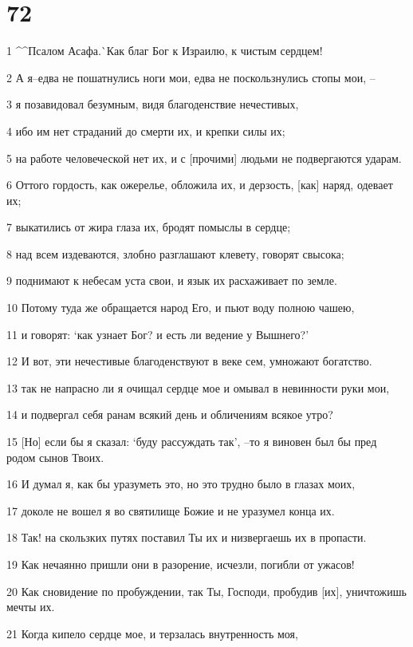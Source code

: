 \chapter{72}

\par 1 ^^Псалом Асафа.^^ Как благ Бог к Израилю, к чистым сердцем!
\par 2 А я--едва не пошатнулись ноги мои, едва не поскользнулись стопы мои, --
\par 3 я позавидовал безумным, видя благоденствие нечестивых,
\par 4 ибо им нет страданий до смерти их, и крепки силы их;
\par 5 на работе человеческой нет их, и с [прочими] людьми не подвергаются ударам.
\par 6 Оттого гордость, как ожерелье, обложила их, и дерзость, [как] наряд, одевает их;
\par 7 выкатились от жира глаза их, бродят помыслы в сердце;
\par 8 над всем издеваются, злобно разглашают клевету, говорят свысока;
\par 9 поднимают к небесам уста свои, и язык их расхаживает по земле.
\par 10 Потому туда же обращается народ Его, и пьют воду полною чашею,
\par 11 и говорят: `как узнает Бог? и есть ли ведение у Вышнего?'
\par 12 И вот, эти нечестивые благоденствуют в веке сем, умножают богатство.
\par 13 так не напрасно ли я очищал сердце мое и омывал в невинности руки мои,
\par 14 и подвергал себя ранам всякий день и обличениям всякое утро?
\par 15 [Но] если бы я сказал: `буду рассуждать так', --то я виновен был бы пред родом сынов Твоих.
\par 16 И думал я, как бы уразуметь это, но это трудно было в глазах моих,
\par 17 доколе не вошел я во святилище Божие и не уразумел конца их.
\par 18 Так! на скользких путях поставил Ты их и низвергаешь их в пропасти.
\par 19 Как нечаянно пришли они в разорение, исчезли, погибли от ужасов!
\par 20 Как сновидение по пробуждении, так Ты, Господи, пробудив [их], уничтожишь мечты их.
\par 21 Когда кипело сердце мое, и терзалась внутренность моя,

